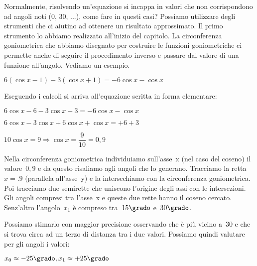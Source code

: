  Normalmente, risolvendo un'equazione si incappa in valori che non 
 corrispondono ad angoli noti (0\grado, 30\grado, ...), come fare in questi 
 casi? Possiamo utilizzare degli strumenti che ci aiutino ad ottenere un 
 risultato approssimato. Il primo strumento lo abbiamo realizzato all'inizio 
 del capitolo. La circonferenza goniometrica che abbiamo disegnato per 
 costruire le funzioni goniometriche ci permette anche di seguire il 
 procedimento inverso e passare dal valore di una funzione all'angolo. 
 Vediamo un esempio.
 
 \begin{esempio}
  \(6 ( \cos x -1) -3 ( \cos x +1) = -6 \cos x - \cos x\)
  
  Eseguendo i calcoli si arriva all'equazione scritta in forma elementare:
  
  \(6 \cos x -6 -3 \cos x -3 = -6 \cos x - \cos x\)
  
  \(6 \cos x -3 \cos x +6 \cos x + \cos x = +6 +3\)
  
  \(10 \cos x= 9 \Rightarrow \cos x = \dfrac{9}{10} = 0,9\)


 \vspace{-6pt}
 \begin{minipage}{.50\textwidth}
Nella circonferenza goniometrica individuiamo sull'asse~x (nel caso del 
coseno) il valore~\(0,9\) e da questo risaliamo agli angoli che lo generano.
Tracciamo la retta~\(x=.9\) (parallela all'asse~y) e la intersechiamo con
la circonferenza goniometrica. Poi tracciamo due semirette che uniscono 
l'origine degli assi con le intersezioni. Gli angoli compresi tra l'asse~x 
e queste due rette hanno il coseno cercato. Senz'altro l'angolo~\(x_1\) è 
compreso tra~\(15\grado\) e~\(30\grado\).

Possiamo stimarlo con maggior precisione osservando che è più vicino a~\(30\) 
e che si trova circa ad un terzo di distanza tra i due valori. 
Possiamo quindi valutare per gli angoli i valori:

\(x_0 \approx -25\grado, x_1 \approx +25\grado\)
 \end{minipage}
 \begin{minipage}{.45\textwidth}
  \begin{center}
\begin{inaccessibleblock}[Soluzione grafica approssimata dell'equazione: 
    \(\cos x = 0,8\).]
    
\end{inaccessibleblock}
  \end{center}
 \end{minipage}
 
 \end{esempio}

